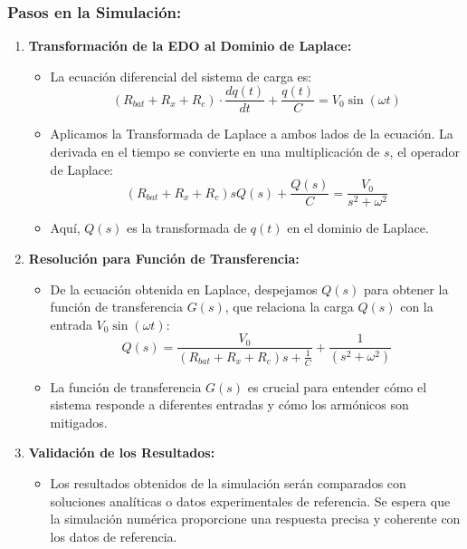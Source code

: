 \subsubsection*{Pasos en la Simulación:}
\begin{enumerate}
    \item \textbf{Transformación de la EDO al Dominio de Laplace:}
          \begin{itemize}
              \item La ecuación diferencial del sistema de carga es:
                    \[
                        (R_{bat} + R_x + R_c) \cdot \frac{dq(t)}{dt} + \frac{q(t)}{C} = V_0 \sin(\omega t)
                    \]
              \item Aplicamos la Transformada de Laplace a ambos lados de la ecuación. La derivada en el tiempo se convierte en una multiplicación de \(s\), el operador de Laplace:
                    \[
                        (R_{bat} + R_x + R_c)sQ(s) + \frac{Q(s)}{C} = \frac{V_0}{s^2 + \omega^2}
                    \]
              \item Aquí, \(Q(s)\) es la transformada de \(q(t)\) en el dominio de Laplace.
          \end{itemize}

    \item \textbf{Resolución para Función de Transferencia:}
          \begin{itemize}
              \item De la ecuación obtenida en Laplace, despejamos \(Q(s)\) para obtener la función de transferencia \(G(s)\), que relaciona la carga \(Q(s)\) con la entrada \(V_0 \sin(\omega t)\):
                    \[
                        Q(s) = \frac{V_0}{ (R_{bat} + R_x + R_c)s + \frac{1}{C}} + \frac{1}{(s^2 + \omega^2)}
                    \]
              \item La función de transferencia \(G(s)\) es crucial para entender cómo el sistema responde a diferentes entradas y cómo los armónicos son mitigados.
          \end{itemize}

    \item \textbf{Validación de los Resultados:}
          \begin{itemize}
              \item Los resultados obtenidos de la simulación serán comparados con soluciones analíticas o datos experimentales de referencia. Se espera que la simulación numérica proporcione una respuesta precisa y coherente con los datos de referencia.
          \end{itemize}
\end{enumerate}


